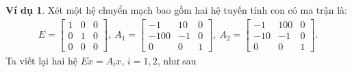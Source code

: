 \documentclass[12pt,a4paper]{report}
\theoremstyle{definition}
\newtheorem{vd}{Ví dụ}
\theoremstyle{definition}
\numberwithin{dl}{chapter}
\numberwithin{vd}{chapter}
\numberwithin{corollary}{chapter}
\numberwithin{lemma}{chapter}
\numberwithin{md}{chapter}
\numberwithin{dn}{chapter}
\numberwithin{cy}{chapter}
\numberwithin{nx}{chapter}
\begin{document}
\begin{vd}  Xét một hệ chuyển mạch bao gồm hai hệ tuyến tính con có ma trận là:\\
$$
\begin{aligned}
E =\left[\begin{array}{ccc}
1 & 0 & 0 \\
0 & 1 & 0 \\
0 & 0 & 0
\end{array}\right], \
A_{1}= {\left[\begin{array}{ccc}
-1 & 10 & 0 \\
-100 & -1 & 0 \\
0 & 0 & 1
\end{array}\right] }, \   
A_{2}= {\left[\begin{array}{ccc}
-1 & 100 & 0 \\
-10 & -1 & 0 \\
0 & 0 & 1
\end{array}\right] }.
\end{aligned} 
$$
Ta viết lại hai hệ $E\dot{x}=A_{i}x$, $i=1,2$, như sau


\end{vd}
\end{document}
